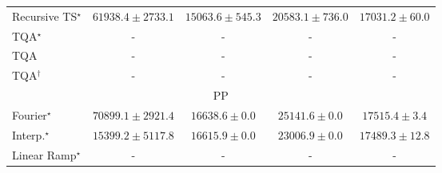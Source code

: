 \begin{tabular}{l|cccc|}
Recursive TS$^\star$ & {\cellcolor[HTML]{A43904}} \color[HTML]{F1F1F1} $61938.4\pm 2733.1$ & {\cellcolor[HTML]{FFFDD9}} \color[HTML]{000000} $15063.6\pm 545.3$ & {\cellcolor[HTML]{FFF6BA}} \color[HTML]{000000} $20583.1\pm 736.0$ & {\cellcolor[HTML]{FFFACE}} \color[HTML]{000000} $17031.2\pm 60.0$ \\
TQA$^\star$ & {\cellcolor[HTML]{000000}} \color[HTML]{F1F1F1} {\cellcolor{white}} \color{black} - & {\cellcolor[HTML]{000000}} \color[HTML]{F1F1F1} {\cellcolor{white}} \color{black} - & {\cellcolor[HTML]{000000}} \color[HTML]{F1F1F1} {\cellcolor{white}} \color{black} - & {\cellcolor[HTML]{000000}} \color[HTML]{F1F1F1} {\cellcolor{white}} \color{black} - \\
TQA & {\cellcolor[HTML]{000000}} \color[HTML]{F1F1F1} {\cellcolor{white}} \color{black} - & {\cellcolor[HTML]{000000}} \color[HTML]{F1F1F1} {\cellcolor{white}} \color{black} - & {\cellcolor[HTML]{000000}} \color[HTML]{F1F1F1} {\cellcolor{white}} \color{black} - & {\cellcolor[HTML]{000000}} \color[HTML]{F1F1F1} {\cellcolor{white}} \color{black} - \\
TQA$^\dagger$ & {\cellcolor[HTML]{000000}} \color[HTML]{F1F1F1} {\cellcolor{white}} \color{black} - & {\cellcolor[HTML]{000000}} \color[HTML]{F1F1F1} {\cellcolor{white}} \color{black} - & {\cellcolor[HTML]{000000}} \color[HTML]{F1F1F1} {\cellcolor{white}} \color{black} - & {\cellcolor[HTML]{000000}} \color[HTML]{F1F1F1} {\cellcolor{white}} \color{black} - \\
\cline{1-5}
\multicolumn{5}{c}{\rule{0pt}{8pt}PP} \\
\midrule
Fourier$^\star$ & {\cellcolor[HTML]{004529}} \color[HTML]{F1F1F1} $70899.1\pm 2921.4$ & {\cellcolor[HTML]{FBFDCF}} \color[HTML]{000000} $16638.6\pm 0.0$ & {\cellcolor[HTML]{E3F4AA}} \color[HTML]{000000} $25141.6\pm 0.0$ & {\cellcolor[HTML]{FAFDC9}} \color[HTML]{000000} $17515.4\pm 3.4$ \\
Interp.$^\star$ & {\cellcolor[HTML]{FCFED7}} \color[HTML]{000000} $15399.2\pm 5117.8$ & {\cellcolor[HTML]{FBFDCF}} \color[HTML]{000000} $16615.9\pm 0.0$ & {\cellcolor[HTML]{ECF7B1}} \color[HTML]{000000} $23006.9\pm 0.0$ & {\cellcolor[HTML]{FAFDC9}} \color[HTML]{000000} $17489.3\pm 12.8$ \\
Linear Ramp$^\star$ & {\cellcolor[HTML]{000000}} \color[HTML]{F1F1F1} {\cellcolor{white}} \color{black} - & {\cellcolor[HTML]{000000}} \color[HTML]{F1F1F1} {\cellcolor{white}} \color{black} - & {\cellcolor[HTML]{000000}} \color[HTML]{F1F1F1} {\cellcolor{white}} \color{black} - & {\cellcolor[HTML]{000000}} \color[HTML]{F1F1F1} {\cellcolor{white}} \color{black} - \\

\end{tabular}
